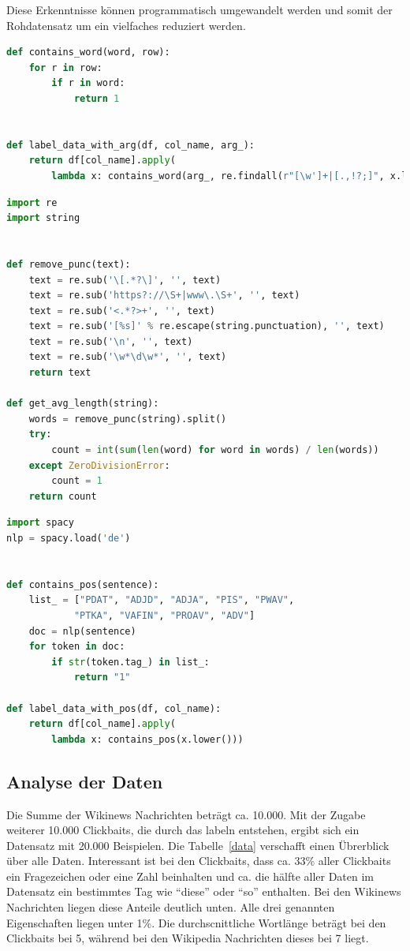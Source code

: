 Diese Erkenntnisse können programmatisch umgewandelt werden und somit der Rohdatensatz um ein vielfaches reduziert werden.


\begin{lstlisting}[language=Python,caption=Funktion welches ein Dataframe je nach Argumenten labelt]
def contains_word(word, row):
    for r in row:
        if r in word:
            return 1


def label_data_with_arg(df, col_name, arg_):
    return df[col_name].apply(
        lambda x: contains_word(arg_, re.findall(r"[\w']+|[.,!?;]", x.lower())))
\end{lstlisting}\label{Label1}

\begin{lstlisting}[language=Python,caption=Funktionen für durchschnittliche Wortlänge und Interpunktion]
import re
import string


def remove_punc(text):
    text = re.sub('\[.*?\]', '', text)
    text = re.sub('https?://\S+|www\.\S+', '', text)
    text = re.sub('<.*?>+', '', text)
    text = re.sub('[%s]' % re.escape(string.punctuation), '', text)
    text = re.sub('\n', '', text)
    text = re.sub('\w*\d\w*', '', text)
    return text

def get_avg_length(string):
    words = remove_punc(string).split()
    try:
        count = int(sum(len(word) for word in words) / len(words))
    except ZeroDivisionError:
        count = 1
    return count
\end{lstlisting}\label{Label2}

\begin{lstlisting}[language=Python,caption=Tagger Funktion]
import spacy
nlp = spacy.load('de')


def contains_pos(sentence):
    list_ = ["PDAT", "ADJD", "ADJA", "PIS", "PWAV", 
            "PTKA", "VAFIN", "PROAV", "ADV"]
    doc = nlp(sentence)
    for token in doc:
        if str(token.tag_) in list_:
            return "1"

def label_data_with_pos(df, col_name):
    return df[col_name].apply(
        lambda x: contains_pos(x.lower()))
\end{lstlisting}\label{Label3}


\subsection{Analyse der Daten}
Die Summe der Wikinews Nachrichten beträgt ca. 10.000. Mit der Zugabe weiterer 10.000 Clickbaits, die durch das labeln entstehen, ergibt sich ein Datensatz mit 20.000 Beispielen. Die Tabelle~\ref{data} verschafft einen Übrerblick über alle Daten. Interessant ist bei den Clickbaits, dass ca. 33\% aller Clickbaits ein Fragezeichen oder eine Zahl beinhalten und ca. die hälfte aller Daten im Datensatz ein bestimmtes Tag wie \enquote{diese} oder \enquote{so} enthalten. Bei den Wikinews Nachrichten liegen diese Anteile deutlich unten. Alle drei genannten Eigenschaften liegen unter 1\%. Die durchscnittliche Wortlänge beträgt bei den Clickbaits bei 5, während bei den Wikipedia Nachrichten dieses bei 7 liegt.

